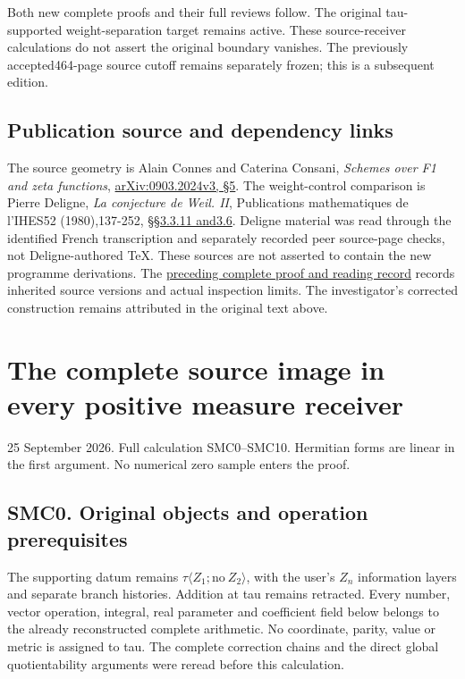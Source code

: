 Both new complete proofs and their full reviews follow. The original
tau-supported weight-separation target remains active. These
source-receiver calculations do not assert the original boundary
vanishes. The previously accepted464-page source cutoff remains
separately frozen; this is a subsequent edition.

\section{Publication source and dependency
links}\label{publication-source-and-dependency-links-9}

The source geometry is Alain Connes and Caterina Consani, \emph{Schemes
over F1 and zeta functions},
\href{https://arxiv.org/abs/0903.2024v3}{arXiv:0903.2024v3, §5}. The
weight-control comparison is Pierre Deligne, \emph{La conjecture de
Weil. II}, Publications mathematiques de l'IHES52 (1980),137-252,
\href{https://www.numdam.org/item/PMIHES_1980__52__137_0/}{§§3.3.11
and3.6}. Deligne material was read through the identified French
transcription and separately recorded peer source-page checks, not
Deligne-authored TeX. These sources are not asserted to contain the new
programme derivations. The
\href{https://github.com/KokunoYumeto/zeta-function-research-reader/blob/36a82ecca98addb8a98b48204e349737856c7223/workbenches/splitzero-tandem/continuations/20260924-cohomology-weight-and-character-lifts/BUILD_AND_REVIEW.md}{preceding
complete proof and reading record} records inherited source versions and
actual inspection limits. The investigator's corrected construction
remains attributed in the original text above.

\chapter{The complete source image in every positive measure
receiver}\label{the-complete-source-image-in-every-positive-measure-receiver}

25 September 2026. Full calculation SMC0--SMC10. Hermitian forms are
linear in the first argument. No numerical zero sample enters the proof.

\section{SMC0. Original objects and operation
prerequisites}\label{smc0.-original-objects-and-operation-prerequisites}

The supporting datum remains
\(\tau\langle Z_1;\mathrm{no}\ Z_2\rangle\), with the user's \(Z_n\)
information layers and separate branch histories. Addition at tau
remains retracted. Every number, vector operation, integral, real
parameter and coefficient field below belongs to the already
reconstructed complete arithmetic. No coordinate, parity, value or
metric is assigned to tau. The complete correction chains and the direct
global quotientability arguments were reread before this calculation.


